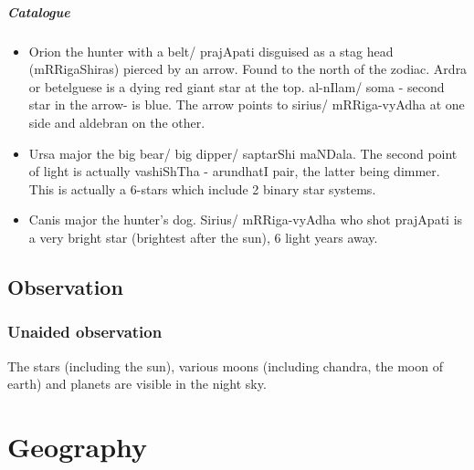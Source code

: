\documentclass[oneside, article]{memoir}
\begin{document}
\subsubsection{Catalogue}
\begin{itemize}
\item Orion the hunter with a belt/ prajApati disguised as a stag head (mRRigaShiras) pierced by an arrow.
\subitem Found to the north of the zodiac.
\subitem Ardra or betelguese is a dying red giant star at the top.
\subitem al-nIlam/ soma - second star in the arrow- is blue.
\subitem The arrow points to sirius/ mRRiga-vyAdha at one side and aldebran on the other.

\item Ursa major the big bear/ big dipper/ saptarShi maNDala.
\subitem The second point of light is actually vashiShTha - arundhatI pair, the latter being dimmer. This is actually a 6-stars which include 2 binary star systems.

\item Canis major the hunter's dog. 
\subitem Sirius/ mRRiga-vyAdha who shot prajApati is a very bright star (brightest after the sun), 6 light years away.
\end{itemize}

\chapter{Observation}
\section{Unaided observation}
The stars (including the sun), various moons (including chandra, the moon of earth) and planets are visible in the night sky.

\part{Geography}


% 
% 
\end{document}
